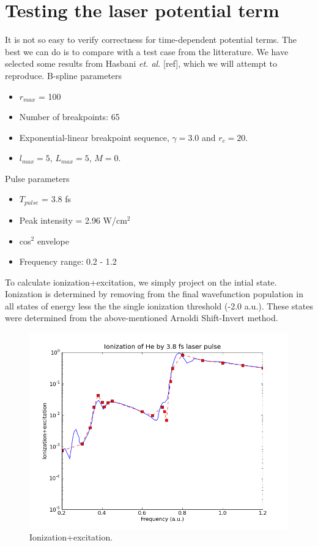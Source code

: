 \documentclass[a4paper,12pt]{paper}
\begin{document}
\section{Testing the laser potential term}
It is not so easy to verify correctness for time-dependent potential terms. The best we can do is to compare with a test case from the litterature. We have selected some results from Hasbani \textit{et. al.} [ref], which we will attempt to reproduce.
%
B-spline parameters
\begin{itemize}
	\item $r_{max}$ = 100
	\item Number of breakpoints: 65
	\item Exponential-linear breakpoint sequence, $\gamma = 3.0$ and $r_c = 20$.
	\item $l_{max} = 5$, $L_{max} = 5$, $M = 0$.
\end{itemize}
%
Pulse parameters
\begin{itemize}
	\item $T_{pulse}$ = 3.8 fs
	\item Peak intensity = 2.96 W/cm$^2$
	\item cos$^2$ envelope
	\item Frequency range: 0.2 - 1.2
\end{itemize}

To calculate ionization+excitation, we simply project on the intial state. Ionization is determined by removing from the final wavefunction population in all states of energy less the the single ionization threshold (-2.0 a.u.). These states were determined from the above-mentioned Arnoldi Shift-Invert method.

\begin{figure}[ht]
\begin{center}
	\includegraphics[width=\textwidth]{hasbani_pyprop2e_ionization_excitation.png}
\end{center}
\caption{Ionization+excitation.}
\end{figure}
\end{document}
